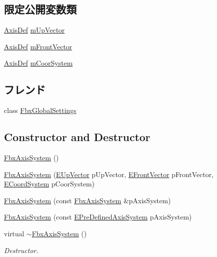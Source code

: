 \subsection*{限定公開変数類}
\begin{DoxyCompactItemize}
\item 
\hyperlink{class_fbx_axis_system_1_1_axis_def}{Axis\+Def} \hyperlink{class_fbx_axis_system_afdefd4d8b257567fe099e28dd1745cfe}{m\+Up\+Vector}
\item 
\hyperlink{class_fbx_axis_system_1_1_axis_def}{Axis\+Def} \hyperlink{class_fbx_axis_system_a8d26e8fb0d5e47bc2e7f667a7b288a5b}{m\+Front\+Vector}
\item 
\hyperlink{class_fbx_axis_system_1_1_axis_def}{Axis\+Def} \hyperlink{class_fbx_axis_system_ac6a0711045499b8e4f699019e3c7fe0e}{m\+Coor\+System}
\end{DoxyCompactItemize}
\subsection*{フレンド}
\begin{DoxyCompactItemize}
\item 
class \hyperlink{class_fbx_axis_system_ac6f6b3953bf13718eb87110d614b3c9a}{Fbx\+Global\+Settings}
\end{DoxyCompactItemize}
\subsection*{Constructor and Destructor}
\begin{DoxyCompactItemize}
\item 
\hyperlink{class_fbx_axis_system_a37136053617df840bae0347820f706a7}{Fbx\+Axis\+System} ()
\item 
\hyperlink{class_fbx_axis_system_a38f184b0d67eeb8578e25c800a0571a5}{Fbx\+Axis\+System} (\hyperlink{class_fbx_axis_system_ad41a41f7ccd9167f54d09b65ad781d00}{E\+Up\+Vector} p\+Up\+Vector, \hyperlink{class_fbx_axis_system_a34bce1daad7ed6ae71916bb825d3ec87}{E\+Front\+Vector} p\+Front\+Vector, \hyperlink{class_fbx_axis_system_a7cf0485846b560fa34f86932c02ec333}{E\+Coord\+System} p\+Coor\+System)
\item 
\hyperlink{class_fbx_axis_system_a3db4f8e0bc1a588cc8c7fc2fa29a532c}{Fbx\+Axis\+System} (const \hyperlink{class_fbx_axis_system}{Fbx\+Axis\+System} \&p\+Axis\+System)
\item 
\hyperlink{class_fbx_axis_system_a8333ad188498e489a2bf065c2b5b1ad3}{Fbx\+Axis\+System} (const \hyperlink{class_fbx_axis_system_a0391b88959ec9ed790cb76eac9a6ed17}{E\+Pre\+Defined\+Axis\+System} p\+Axis\+System)
\item 
virtual \hyperlink{class_fbx_axis_system_ae1c61cb9cf7208d0c4373d8c894bec8c}{$\sim$\+Fbx\+Axis\+System} ()
\begin{DoxyCompactList}\small\item\em Destructor. \end{DoxyCompactList}\end{DoxyCompactItemize}
